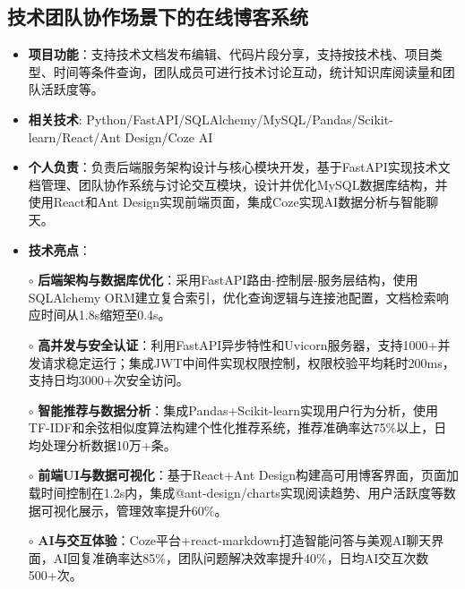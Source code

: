 \subsection{\textbf{技术团队协作场景下的在线博客系统} \hspace{2cm}{2025.06 -- 2025.07}}
  \begin{normalsize}
    \begin{itemize}
    \item \textbf{项目功能}：支持技术文档发布编辑、代码片段分享，支持按技术栈、项目类型、时间等条件查询，团队成员可进行技术讨论互动，统计知识库阅读量和团队活跃度等。
    \item \textbf{相关技术}: Python/FastAPI/SQLAlchemy/MySQL/Pandas/Scikit-learn/React/Ant Design/Coze AI
    \item \textbf{个人负责}：负责后端服务架构设计与核心模块开发，基于FastAPI实现技术文档管理、团队协作系统与讨论交互模块，设计并优化MySQL数据库结构，并使用React和Ant Design实现前端页面，集成Coze实现AI数据分析与智能聊天。
    \item \textbf{技术亮点}：
    \setlength{\itemindent}{1em} %
      \item[$\circ$] \textbf{后端架构与数据库优化}：采用FastAPI路由-控制层-服务层结构，使用SQLAlchemy ORM建立复合索引，优化查询逻辑与连接池配置，文档检索响应时间从1.8s缩短至0.4s。
      \item[$\circ$] \textbf{高并发与安全认证}：利用FastAPI异步特性和Uvicorn服务器，支持1000+并发请求稳定运行；集成JWT中间件实现权限控制，权限校验平均耗时200ms，支持日均3000+次安全访问。
      \item[$\circ$] \textbf{智能推荐与数据分析}：集成Pandas+Scikit-learn实现用户行为分析，使用TF-IDF和余弦相似度算法构建个性化推荐系统，推荐准确率达75\%以上，日均处理分析数据10万+条。
      \item[$\circ$] \textbf{前端UI与数据可视化}：基于React+Ant Design构建高可用博客界面，页面加载时间控制在1.2s内，集成@ant-design/charts实现阅读趋势、用户活跃度等数据可视化展示，管理效率提升60\%。
      \item[$\circ$] \textbf{AI与交互体验}：Coze平台+react-markdown打造智能问答与美观AI聊天界面，AI回复准确率达85\%，团队问题解决效率提升40\%，日均AI交互次数500+次。
    \end{itemize}
  \end{normalsize}